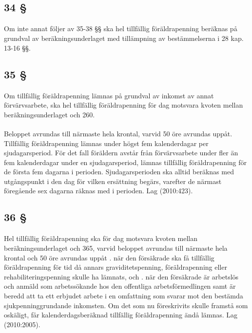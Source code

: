\documentclass[a4paper,notitlepage,openany,10pt]{book}
\begin{document}
\subsection*{34 §}
\paragraph*{}
Om inte annat följer av 35-38 §§ ska hel tillfällig föräldrapenning beräknas på grundval av beräkningsunderlaget med tillämpning av bestämmelserna i 28 kap. 13-16 §§.
\subsection*{35 §}
\paragraph*{}
Om tillfällig föräldrapenning lämnas på grundval av inkomst av annat förvärvsarbete, ska hel tillfällig föräldrapenning för dag motsvara kvoten mellan beräkningsunderlaget och 260.
\paragraph*{}
Beloppet avrundas till närmaste hela krontal, varvid 50 öre avrundas uppåt. Tillfällig föräldrapenning lämnas under högst fem kalenderdagar per sjudagarsperiod. För det fall föräldern avstår från förvärvsarbete under fler än fem kalenderdagar under en sjudagarsperiod, lämnas tillfällig föräldrapenning för de första fem dagarna i perioden. Sjudagarsperioden ska alltid beräknas med utgångspunkt i den dag för vilken ersättning begärs, varefter de närmast föregående sex dagarna räknas med i perioden.
Lag (2010:423).
\subsection*{36 §}
\paragraph*{}
Hel tillfällig föräldrapenning ska för dag motsvara kvoten mellan beräkningsunderlaget och 365, varvid beloppet avrundas till närmaste hela krontal och 50 öre avrundas uppåt
. när den försäkrade ska få tillfällig föräldrapenning för tid då annars graviditetspenning, föräldrapenning eller rehabiliteringspenning skulle ha lämnats, och
. när den försäkrade är arbetslös och anmäld som arbetssökande hos den offentliga arbetsförmedlingen samt är beredd att ta ett erbjudet arbete i en omfattning som svarar mot den bestämda sjukpenninggrundande inkomsten. Om det som nu föreskrivits skulle framstå som oskäligt, får kalenderdagsberäknad tillfällig föräldrapenning ändå lämnas.
Lag (2010:2005).
\end{document}

